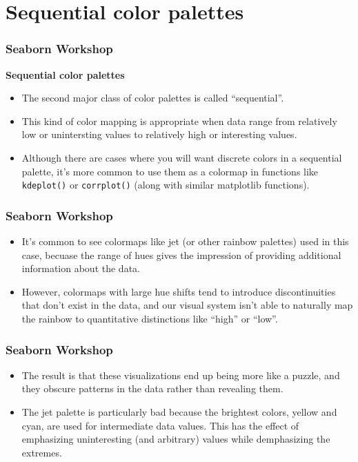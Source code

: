 \documentclass{beamer}
\begin{document}
	
\section{Sequential color palettes}
\begin{frame}
\frametitle{Seaborn Workshop}
\large

\textbf{Sequential color palettes}
\begin{itemize}
\item The second major class of color palettes is called “sequential”. 
\item This kind of color mapping is appropriate when data range from relatively low or unintersting values to relatively high or interesting values. 
\item Although there are cases where you will want discrete colors in a sequential palette, it’s more common to use them as a colormap in functions like \texttt{kdeplot()} or \texttt{corrplot()} (along with similar matplotlib functions).
\end{itemize}

\end{frame}
\begin{frame}[fragile]
	
	\frametitle{Seaborn Workshop}
	\large
\begin{itemize}
\item It’s common to see colormaps like jet (or other rainbow palettes) used in this case, becuase the range of hues gives the impression of providing additional information about the data. 
\item However, colormaps with large hue shifts tend to introduce discontinuities that don’t exist in the data, and our visual system isn’t able to naturally map the rainbow to quantitative distinctions like “high” or “low”. 
\end{itemize}
\end{frame}
\begin{frame}[fragile]
	
	\frametitle{Seaborn Workshop}
	\large
	\begin{itemize}
\item The result is that these visualizations end up being more like a puzzle, and they obscure patterns in the data rather than revealing them. 
\item The jet palette is particularly bad because the brightest colors, yellow and cyan, are used for intermediate data values. This has the effect of emphasizing uninteresting (and arbitrary) values while demphasizing the extremes.
\end{itemize}
\end{frame}
\end{document}
